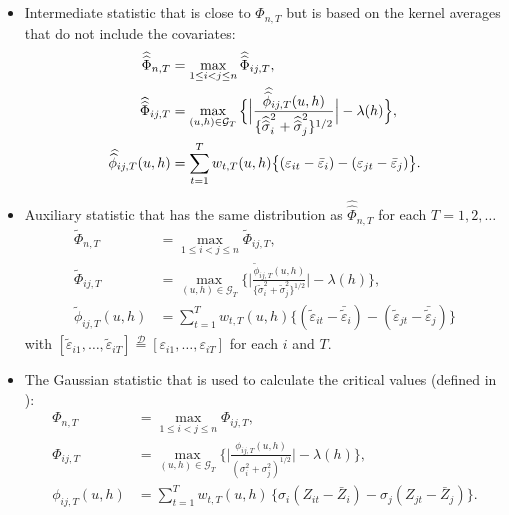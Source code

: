 \documentclass[a4paper,12pt]{article}
\makeatletter
\renewcommand{\eqref}[1]{\tagform@{\ref{#1}}}
\newcommand{\doublehat}[1]{\skew{5.5}\widehat{\widehat{#1}}}
\newcommand{\doublehattwo}[1]{\widehat{\widehat{#1}}}
\makeatother
\begin{document}
\begin{itemize}
\item Intermediate statistic that is close to $\widehat{\Phi}_{n, T}$ but is based on the kernel averages that do not include the covariates:
\begin{align}\label{eq-stat-3}
	\doublehattwo{\Phi}_{n,T} &= \max_{1 \le i < j \le n} \doublehattwo{\Phi}_{ij,T},\nonumber \\
	\doublehattwo{\Phi}_{ij,T} &= \max_{(u,h) \in \mathcal{G}_T} \Big\{ \Big| \frac{\doublehat{\phi}_{ij,T}(u,h)} {\{ \doublehattwo{\sigma}_i^2 + \doublehattwo{\sigma}_j^2 \}^{1/2}} \Big| - \lambda(h) \Big \}, \\
	 \doublehat{\phi}_{ij,T}(u,h) &= \sum_{t=1}^T w_{t,T}(u,h) \big\{ (\varepsilon_{it} - \bar{\varepsilon}_i) - (\varepsilon_{jt} - \bar{\varepsilon}_j)  \big\}.\nonumber 
\end{align}
\item Auxiliary statistic that has the same distribution as $\doublehattwo{\Phi}_{n, T}$ for each $T = 1, 2, \ldots$
\begin{align}\label{eq-stat-4}
\widetilde{\Phi}_{n,T} &= \max_{1 \le i < j \le n} \widetilde{\Phi}_{ij,T},\nonumber\\
\widetilde{\Phi}_{ij, T} &= \max_{(u,h) \in \mathcal{G}_T} \Big\{ \Big|\frac{\widetilde{\phi}_{ij, T}(u,h)}{\{\widetilde{\sigma}_i^2 + \widetilde{\sigma}_j^2 \}^{1/2}} \Big| - \lambda(h) \Big\}, \\
\widetilde{\phi}_{ij, T}(u,h) &= \sum\nolimits_{t=1}^T w_{t,T}(u,h) \big\{ (\widetilde{\varepsilon}_{it} - \bar{\widetilde{\varepsilon}}_i)  - (\widetilde{\varepsilon}_{jt} - \bar{\widetilde{\varepsilon}}_j)\big\}\nonumber
\end{align}
with $[\widetilde{\varepsilon}_{i1},\ldots,\widetilde{\varepsilon}_{iT}] \stackrel{\mathcal{D}}{=} [\varepsilon_{i1},\ldots,\varepsilon_{iT}]$ for each $i$ and $T$.

\item The Gaussian statistic that is used to calculate the critical values (defined in \eqref{Phi-statistic}):
\begin{align}\label{eq-stat-5}
	\Phi_{n,T}  &= \max_{1 \le i < j \le n} \Phi_{ij,T}, \nonumber\\
      	\Phi_{ij,T} &= \max_{(u,h) \in \mathcal{G}_T} \Big\{ \Big|\frac{\phi_{ij,T}(u,h)}{({\sigma}_i^2 + {\sigma}_j^2)^{1/2}}\Big| - \lambda(h) \Big\},\\
	 \phi_{ij,T}(u,h) & = \sum\nolimits_{t=1}^T w_{t,T}(u,h) \, \big\{{\sigma}_i (Z_{it} - \bar{Z}_i) - {\sigma}_j (Z_{jt} - \bar{Z}_j) \big\}.\nonumber
\end{align}
\end{itemize}
\end{document}
